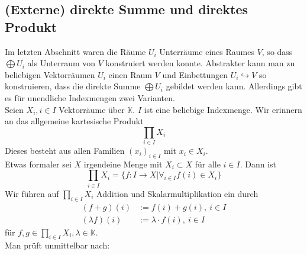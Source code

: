 \documentclass[12pt,a4paper]{article}
\theoremstyle{definition}
\theoremstyle{remark}
\begin{document}
	\subsection{(Externe) direkte Summe und direktes Produkt}
	Im letzten Abschnitt waren die Räume $U_i$ Unterräume eines Raumes $V$, so dass $\bigoplus U_i$ als Unterraum von $V$ konstruiert werden konnte. Abstrakter kann man zu beliebigen Vektorräumen $U_i$ einen Raum $V$ und Einbettungen $U_i \hookrightarrow V$ so konstruieren, dass die direkte Summe $\bigoplus U_i$ gebildet werden kann. Allerdings gibt es für unendliche Indexmengen zwei Varianten. \\
	Seien $X_i, i \in I$ Vektorräume über $\mathbb{K}$. $I$ ist eine beliebige Indexmenge. Wir erinnern an das allgemeine kartesische Produkt
	\begin{equation}
		\prod\limits_{i \in I} X_i
	\end{equation}
	Dieses besteht aus allen Familien $(x_i)_{i \in I}$ mit $x_i \in X_i$. \\
	Etwas formaler sei $X$ irgendeine Menge mit $X_i \subset X$ für alle $i \in I$. Dann ist
	\begin{equation} 
		\prod\limits_{i \in I} X_i = \{ f: I \rightarrow X | \forall_{i \in I} f(i) \in X_i \}
	\end{equation}
	Wir führen auf $\prod_{i \in I} X_i$ Addition und Skalarmultiplikation ein durch
	\begin{equation}
		\begin{split}
			(f+g)(i) &:= f(i)+g(i), \ i \in I \\
			(\lambda f)(i) &:= \lambda \cdot f(i), \ i \in I 
		\end{split}
	\end{equation}
	für $f,g \in \prod_{i \in I}X_i, \lambda \in \mathbb{K}$. \\
	Man prüft unmittelbar nach:
\end{document}
